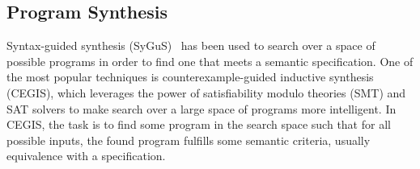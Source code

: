 \documentclass[sigplan,10pt,review,anonymous]{acmart}\settopmatter{printfolios=true,printccs=false,printacmref=false}
\begin{document}





\subsection{Program Synthesis}
Syntax-guided synthesis (SyGuS)~\cite{sygus} has been used
to search over a space of possible programs in order to find one that meets
a semantic specification.  One of the most popular techniques is counterexample-guided
inductive synthesis (CEGIS), which leverages the power of satisfiability modulo theories
(SMT) and SAT solvers to make search over a large space of programs more intelligent.
In CEGIS, the task is to find some program in the search space such that for all possible
inputs, the found program fulfills some semantic criteria, usually equivalence with
a specification.
\end{document}
